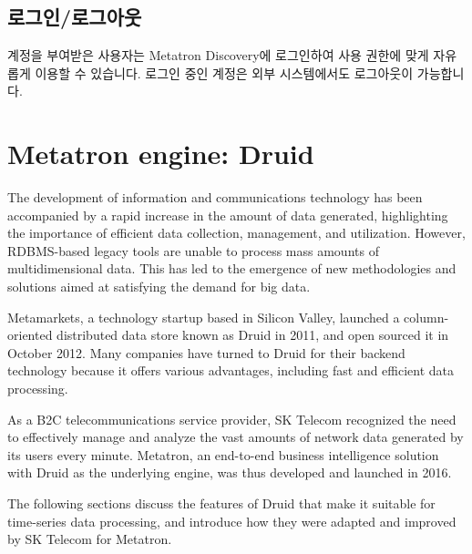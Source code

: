 \documentclass[letterpaper,10pt,english]{sphinxmanual}
\begin{document}
\subsection{로그인/로그아웃}
\label{\detokenize{discovery/part01/structure:id10}}
계정을 부여받은 사용자는 Metatron Discovery에 로그인하여 사용 권한에 맞게 자유롭게 이용할 수 있습니다. 로그인 중인 계정은 외부 시스템에서도 로그아웃이 가능합니다.


\section{Metatron engine: Druid}
\label{\detokenize{discovery/part01/engine:metatron-druid}}\label{\detokenize{discovery/part01/engine::doc}}
The development of information and communications technology has been accompanied by a rapid increase in the amount of data generated, highlighting the importance of efficient data collection, management, and utilization. However, RDBMS-based legacy tools are unable to process mass amounts of multidimensional data. This has led to the emergence of new methodologies and solutions aimed at satisfying the demand for big data.

Metamarkets, a technology startup based in Silicon Valley, launched a column-oriented distributed data store known as Druid in 2011, and open sourced it in October 2012. Many companies have turned to Druid for their backend technology because it offers various advantages, including fast and efficient data processing.

As a B2C telecommunications service provider, SK Telecom recognized the need to effectively manage and analyze the vast amounts of network data generated by its users every minute. Metatron, an end-to-end business intelligence solution with Druid as the underlying engine, was thus developed and launched in 2016.
\begin{quote}

\begin{figure}[H]
\centering

\noindent{}
\end{figure}
\end{quote}

The following sections discuss the features of Druid that make it suitable for time-series data processing, and introduce how they were adapted and improved by SK Telecom for Metatron.
\end{document}
